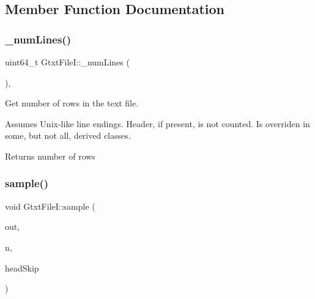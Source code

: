 \subsection{Member Function Documentation}
\mbox{\label{classsamp_files_1_1_gtxt_file_i_a5452b2663b374cdaa6b6bd5f34683a3c}} 
\subsubsection{\texorpdfstring{\+\_\+num\+Lines()}{\_numLines()}}
{\footnotesize\ttfamily uint64\+\_\+t Gtxt\+File\+I\+::\+\_\+num\+Lines (\begin{DoxyParamCaption}{ }\end{DoxyParamCaption})\hspace{0.3cm}{\ttfamily [protected]}, {\ttfamily [virtual]}}



Get number of rows in the text file. 

Assumes Unix-\/like line endings. Header, if present, is not counted. Is overriden in some, but not all, derived classes.

\begin{DoxyReturn}{Returns}
number of rows 
\end{DoxyReturn}
\mbox{\label{classsamp_files_1_1_gtxt_file_i_ae3a13c1ff7dce452859abf0942da0631}} 
\subsubsection{\texorpdfstring{sample()}{sample()}\hspace{0.1cm}{\footnotesize\ttfamily [1/2]}}
{\footnotesize\ttfamily void Gtxt\+File\+I\+::sample (\begin{DoxyParamCaption}\item[{\hyperlink{classsamp_files_1_1_gtxt_file_o}{Gtxt\+FileO} \&}]{out,  }\item[{const uint64\+\_\+t \&}]{n,  }\item[{const bool \&}]{head\+Skip }\end{DoxyParamCaption})}



